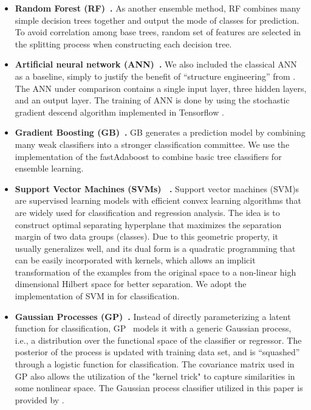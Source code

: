 \begin{itemize}
  \item
  \textbf{Random Forest (RF)~\cite{bib:liaw2002classification}.}
  As another ensemble method, RF combines many simple decision trees together and output the mode of classes for prediction.
  To avoid correlation among base trees, random set of features are selected in the splitting process when constructing each decision tree.

  \item
  \textbf{Artificial neural network (ANN)~\cite{bib:wang2003artificial}.}
  We also included the classical ANN as a baseline, simply to justify the benefit of ``structure engineering'' from \modelname. The ANN under comparison contains a single input layer, three hidden layers, and an output layer. The training of ANN is done by using the stochastic gradient descend algorithm implemented in Tensorflow \cite{bib:Tensorflow}.

  \item
  \textbf{Gradient Boosting (GB)~\cite{bib:friedman2002stochastic}.}
  GB generates a prediction model by combining many weak classifiers into a stronger classification committee.
  We use the implementation of the fastAdaboost \cite{bib:fastAdaboost} to combine basic tree classifiers for ensemble learning.

  \item
  \textbf{Support Vector Machines  (SVMs)~\cite{bib:wang2005support} .}
  Support vector machines (SVM)s are supervised learning models with efficient convex learning algorithms that are widely used for classification and regression analysis. 
  The idea is to construct optimal separating hyperplane that maximizes the separation margin of two data groups (classes).
  Due to this geometric property, it usually generalizes well, and its dual form is a quadratic programming that can be easily incorporated with kernels, which allows an implicit transformation of the examples from the original space to a non-linear high dimensional Hilbert space for better separation. We adopt the implementation of SVM in \cite{bib:scikit-learn} for classification.

 \item
 \textbf{Gaussian Processes (GP)~\cite{bib:rasmussen2006gaussian}.}
  Instead of directly parameterizing a latent function for classification, GP~\cite{bib:rasmussen2006gaussian} models it with a generic Gaussian process, i.e., a distribution over the functional space of the classifier or regressor. 
  The posterior of the process is updated with training data set, and is ``squashed'' through a logistic function for classification. The covariance matrix used in GP also allows the utilization of the "kernel trick" to capture similarities in some nonlinear space. The Gaussian process classifier utilized in this paper is provided by \cite{bib:scikit-learn}.


\end{itemize}
